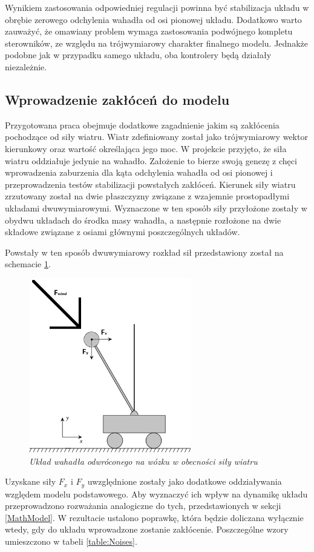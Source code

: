 \documentclass[12pt, twoside, openany]{report}
\theoremstyle{definition}
\begin{document}
Wynikiem zastosowania odpowiedniej regulacji powinna być stabilizacja układu w obrębie zerowego odchylenia wahadła od osi pionowej układu. Dodatkowo warto zauważyć, że omawiany problem wymaga zastosowania podwójnego kompletu sterowników, ze względu na trójwymiarowy charakter finalnego modelu. Jednakże podobne jak w przypadku samego układu, oba kontrolery będą działały niezależnie.

\subsection{Wprowadzenie zakłóceń do modelu}
Przygotowana praca obejmuje dodatkowe zagadnienie jakim są zakłócenia pochodzące od siły wiatru. Wiatr zdefiniowany został jako trójwymiarowy wektor kierunkowy oraz wartość określająca jego moc. W projekcie przyjęto, że siła wiatru oddziałuje jedynie na wahadło. Założenie to bierze swoją genezę z chęci wprowadzenia zaburzenia dla kąta odchylenia wahadła od osi pionowej i przeprowadzenia testów stabilizacji powstałych zakłóceń. Kierunek siły wiatru zrzutowany został na dwie płaszczyzny związane z wzajemnie prostopadłymi układami dwuwymiarowymi.  Wyznaczone w ten sposób siły przyłożone zostały w obydwu układach do środka masy wahadła, a następnie rozłożone na dwie składowe związane z osiami głównymi poszczególnych układów. 

Powstały w ten sposób dwuwymiarowy rozkład sił przedstawiony został na schemacie \ref{WindForce}.

\begin{figure}[H]
	\centering
		\includegraphics[width = 200pt]{WindForce} 
		\caption{\textit{Układ wahadła odwróconego na wózku w obecności siły wiatru}}
		\label{WindForce}
\end{figure}

Uzyskane siły $F_x$ i $F_y$ uwzględnione zostały jako dodatkowe oddziaływania względem modelu podstawowego. Aby wyznaczyć ich wpływ na dynamikę układu przeprowadzono rozważania analogiczne do tych, przedstawionych w sekcji \ref{MathModel}. W rezultacie ustalono poprawkę, która będzie doliczana wyłącznie wtedy, gdy do układu wprowadzone zostanie zakłócenie. Poszczególne wzory umieszczono w tabeli \ref{table:Noises}.
\end{document}
